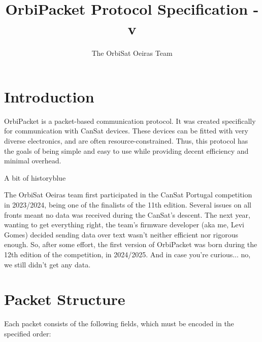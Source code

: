 \documentclass[a4paper,11pt,english]{article}
\title{OrbiPacket Protocol Specification - v\version}
\author{The OrbiSat Oeiras Team}
\date{}
\def\notebox#1#2{
  \begin{admobox}{#1}{blue}
  #2
  \end{admobox}
}
\begin{document}
\maketitle

\tableofcontents

\section{Introduction}

OrbiPacket is a packet-based communication protocol. It was created specifically for communication with CanSat devices. These devices can be fitted with very diverse electronics, and are often resource-constrained. Thus, this protocol has the goals of being simple and easy to use while providing decent efficiency and minimal overhead.

\notebox{A bit of history}{
  The OrbiSat Oeiras team first participated in the CanSat Portugal competition in 2023/2024, being one of the finalists of the 11th edition. Several issues on all fronts meant no data was received during the CanSat's descent. The next year, wanting to get everything right, the team's firmware developer (aka me, Levi Gomes) decided sending data over text wasn't neither efficient nor rigorous enough. So, after some effort, the first version of OrbiPacket was born during the 12th edition of the competition, in 2024/2025. And in case you're curious... no, we still didn't get any data.
}

\section{Packet Structure}

Each packet consists of the following fields, which must be encoded in the specified order:
\end{document}
